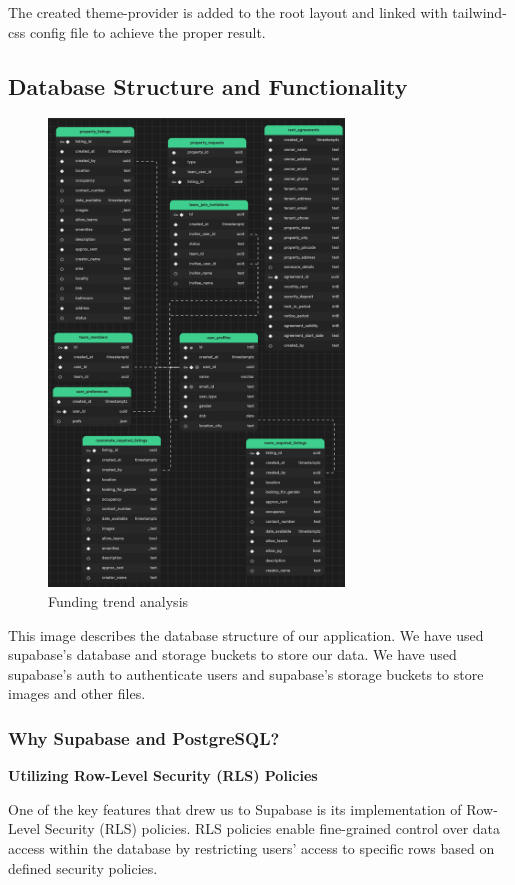 The created theme-provider is added to the root layout and linked with tailwind-css config file to achieve the proper result.

\clearpage
\subsection{Database Structure and Functionality}

\begin{figure}[h]
    \centering
    \includegraphics[width=0.7\textwidth]{Images/schema_visualizer.png}
    \caption{Funding trend analysis}
\end{figure}
This image describes the database structure of our application. We have used supabase's database and storage buckets to store our data. We have used supabase's auth to authenticate users and supabase's storage buckets to store images and other files.
\clearpage

\subsubsection{Why Supabase and PostgreSQL?}

\noindent\textbf{Utilizing Row-Level Security (RLS) Policies}
\par\smallskip\noindent One of the key features that drew us to Supabase is its implementation of Row-Level Security (RLS) policies. RLS policies enable fine-grained control over data access within the database by restricting users' access to specific rows based on defined security policies.

